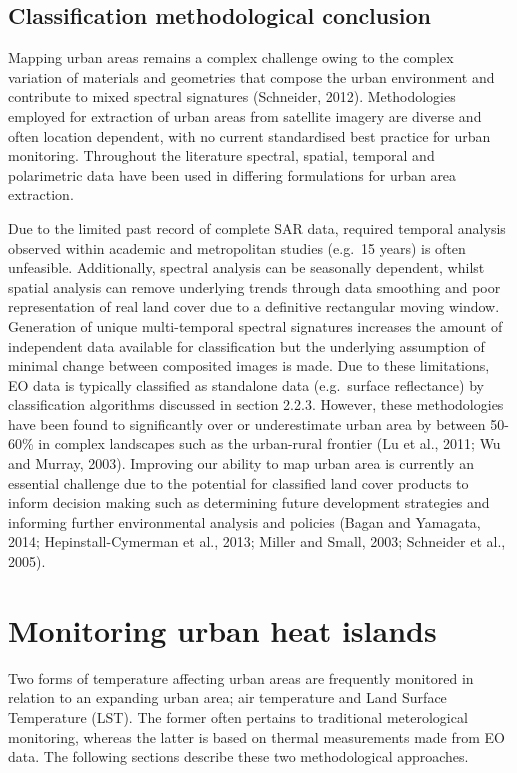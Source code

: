 \documentclass[]{book}
\begin{document}
\subsection{Classification methodological
conclusion}\label{classification-methodological-conclusion}

Mapping urban areas remains a complex challenge owing to the complex
variation of materials and geometries that compose the urban environment
and contribute to mixed spectral signatures (Schneider, 2012).
Methodologies employed for extraction of urban areas from satellite
imagery are diverse and often location dependent, with no current
standardised best practice for urban monitoring. Throughout the
literature spectral, spatial, temporal and polarimetric data have been
used in differing formulations for urban area extraction.

Due to the limited past record of complete SAR data, required temporal
analysis observed within academic and metropolitan studies (e.g.~15
years) is often unfeasible. Additionally, spectral analysis can be
seasonally dependent, whilst spatial analysis can remove underlying
trends through data smoothing and poor representation of real land cover
due to a definitive rectangular moving window. Generation of unique
multi-temporal spectral signatures increases the amount of independent
data available for classification but the underlying assumption of
minimal change between composited images is made. Due to these
limitations, EO data is typically classified as standalone data
(e.g.~surface reflectance) by classification algorithms discussed in
section 2.2.3. However, these methodologies have been found to
significantly over or underestimate urban area by between 50-60\% in
complex landscapes such as the urban-rural frontier (Lu et al., 2011; Wu
and Murray, 2003). Improving our ability to map urban area is currently
an essential challenge due to the potential for classified land cover
products to inform decision making such as determining future
development strategies and informing further environmental analysis and
policies (Bagan and Yamagata, 2014; Hepinstall-Cymerman et al., 2013;
Miller and Small, 2003; Schneider et al., 2005).

\section{Monitoring urban heat
islands}\label{monitoring-urban-heat-islands}

Two forms of temperature affecting urban areas are frequently monitored
in relation to an expanding urban area; air temperature and Land Surface
Temperature (LST). The former often pertains to traditional
meterological monitoring, whereas the latter is based on thermal
measurements made from EO data. The following sections describe these
two methodological approaches.
\end{document}
